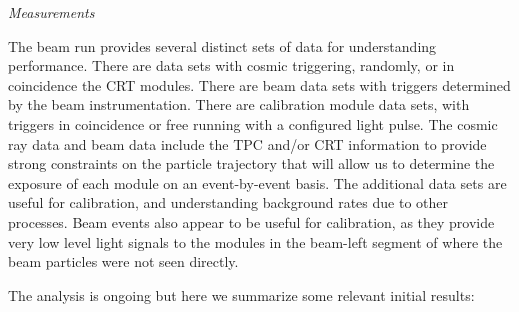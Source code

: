 
\label{sec:protodune-resulSilicon Photosensors}


\textit{  Measurements}


The  beam run provides several distinct sets of data for understanding  performance.  
There are data sets with cosmic triggering, randomly, or in coincidence the CRT modules.
There are beam data sets with triggers determined by the beam instrumentation.
There are calibration module data sets, with triggers in coincidence or free running with a configured light pulse. The cosmic ray data and beam data include the TPC and/or CRT information to provide strong constraints on the particle trajectory that will allow us to determine the exposure of each module on an event-by-event basis.  The additional data sets are useful for calibration, and understanding background rates due to other processes.  Beam events also appear to be useful for calibration, as they provide very low level light signals to the modules in the beam-left segment of  where the beam particles were not seen directly.

The analysis is ongoing but here we summarize some relevant initial results:

